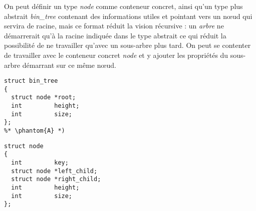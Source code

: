 \documentclass[11pt,a4paper]{article}
\begin{document}
\bigskip

%
%
%

On peut définir un type \textit{node} comme conteneur concret, ainsi qu'un type plus abstrait \textit{bin\_tree} contenant des informations utiles et pointant vers un nœud qui servira de racine, mais ce format réduit la vision récursive : un \textit{arbre} ne démarrerait qu'à la racine indiquée dans le type abstrait ce qui réduit la possibilité de ne travailler qu'avec un sous-arbre plus tard.
On peut se contenter de travailler avec le conteneur concret \textit{node} et y ajouter les propriétés du sous-arbre démarrant sur ce même nœud.

\vspace*{-0.5cm}

\begin{center}
\begin{table}[ht!]
  \centering
  \begin{minipage}{0.45\textwidth}

\lstset{language=C}
\begin{lstlisting}[frame=single]
%* \phantom{A} *)
struct bin_tree
{
  struct node *root;
  int         height;
  int         size;
};
%* \phantom{A} *)
\end{lstlisting}

  \end{minipage}
  \hfillx
  \begin{minipage}{0.45\textwidth}

\begin{lstlisting}[frame=single]
struct node
{
  int         key;
  struct node *left_child;
  struct node *right_child;
  int         height;
  int         size;
};
\end{lstlisting}

  \end{minipage}
\end{table}
\end{center}
\end{document}
